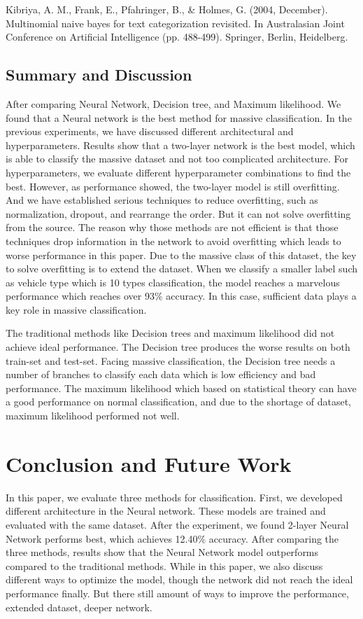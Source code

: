 \documentclass[runningheads]{llncs}
\begin{document}
Kibriya, A. M., Frank, E., Pfahringer, B., \& Holmes, G. (2004, December). Multinomial naive bayes for text categorization revisited. In Australasian Joint Conference on Artificial Intelligence (pp. 488-499). Springer, Berlin, Heidelberg.

\subsection{Summary and Discussion}
After comparing Neural Network, Decision tree, and Maximum likelihood. We found that a Neural network is the best method for massive classification. In the previous experiments, we have discussed different architectural and hyperparameters. Results show that a two-layer network is the best model, which is able to classify the massive dataset and not too complicated architecture. For hyperparameters, we evaluate different hyperparameter combinations to find the best. However, as performance showed, the two-layer model is still overfitting. And we have established serious techniques to reduce overfitting, such as normalization, dropout, and rearrange the order. But it can not solve overfitting from the source. The reason why those methods are not efficient is that those techniques drop information in the network to avoid overfitting which leads to worse performance in this paper. Due to the massive class of this dataset, the key to solve overfitting is to extend the dataset. When we classify a smaller label such as vehicle type which is 10 types classification, the model reaches a marvelous performance which reaches over 93\% accuracy. In this case, sufficient data plays a key role in massive classification.

The traditional methods like Decision trees and maximum likelihood did not achieve ideal performance. The Decision tree produces the worse results on both train-set and test-set. Facing massive classification, the Decision tree needs a number of branches to classify each data which is low efficiency and bad performance. The maximum likelihood which based on statistical theory can have a good performance on normal classification, and due to the shortage of dataset, maximum likelihood performed not well.
\section{Conclusion and Future Work}
In this paper, we evaluate three methods for classification. First, we developed different architecture in the Neural network. These models are trained and evaluated with the same dataset. After the experiment, we found 2-layer Neural Network performs best, which achieves 12.40\% accuracy. After comparing the three methods, results show that the Neural Network model outperforms compared to the traditional methods. While in this paper, we also discuss different ways to optimize the model, though the network did not reach the ideal performance finally. But there still amount of ways to improve the performance, extended dataset, deeper network.
\end{document}
